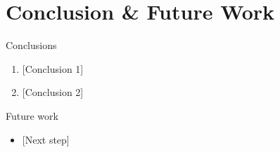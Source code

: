 \section{Conclusion \& Future Work}

\begin{frame}{Conclusions}
  \begin{enumerate}
    \item {[Conclusion 1]}
    \item {[Conclusion 2]}
  \end{enumerate}
  \begin{block}{Future work}
    \begin{itemize}
      \item {[Next step]}
    \end{itemize}
  \end{block}
\end{frame}
